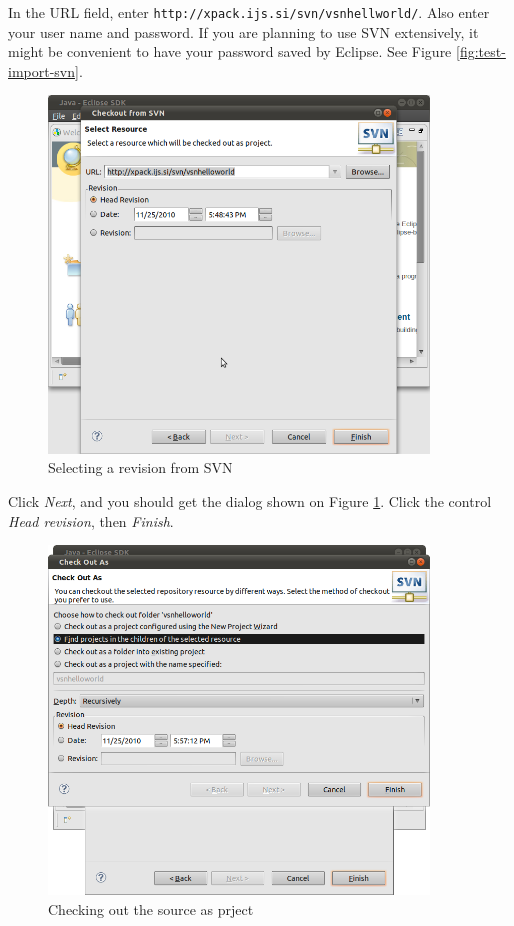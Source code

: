 \documentclass[a4paper, 10pt]{article}
\begin{document}
In the URL field, enter
\verb+http://xpack.ijs.si/svn/vsnhellworld/+.
Also enter your user name and password.
If you are planning to use SVN extensively, it might be convenient to have your
password saved by Eclipse.
See Figure \ref{fig:test-import-svn}.

    \begin{figure}[H]
    \centering
        \includegraphics[width=0.9\textwidth]{./png-install-guide/test-prj-head.png}
        \caption{Selecting a revision from SVN}
        \label{fig:test-prj-head}
    \end{figure}

Click \emph{Next}, and you should get the dialog shown on
Figure \ref{fig:test-prj-head}.
Click the control \emph{Head revision}, then \emph{Finish}.

    \begin{figure}[H]
    \centering
        \includegraphics[width=0.9\textwidth]{./png-install-guide/test-checkout-as.png}
        \caption{Checking out the source as prject}
        \label{fig:test-checkout-as}
    \end{figure}
\end{document}

